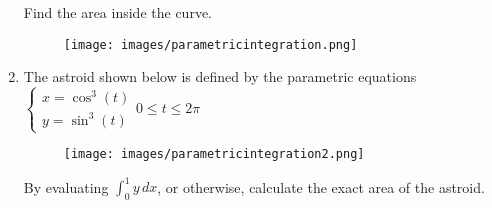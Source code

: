 \documentclass[../main.tex]{subfiles}
\begin{document}
\begin{enumerate}[itemsep=1cm]
    Find the area inside the curve.

    \begin{figure}[h]
       \centering
       \texttt{[image: images/parametricintegration.png]}
    \end{figure}   

    \item 
    The astroid shown below is defined by the parametric equations $\begin{cases} x=\cos^3{(t)} \\ y=\sin^3{(t)} \end{cases} 0\leq t \leq 2\pi$

    \begin{figure}[h]
        \centering
        \texttt{[image: images/parametricintegration2.png]}
    \end{figure}

    By evaluating $\int_0^1 y\,dx$, or otherwise, calculate the exact area of the astroid.
\end{enumerate}
\pagebreak
\end{document}
